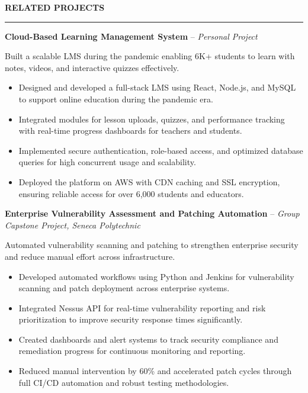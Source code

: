 \documentclass[10pt,letterpaper]{article}
\begin{document}
\vspace{6pt}

\textbf{RELATED PROJECTS}\\[-8pt]
\noindent\rule{\textwidth}{1pt}

\vspace{-2pt}

\textbf{Cloud-Based Learning Management System} -- \emph{Personal Project}

\vspace{-1pt}

Built a scalable LMS during the pandemic enabling 6K+ students to learn with notes, videos, and interactive quizzes effectively.
\vspace{-1pt}
\begin{itemize}
\item Designed and developed a full-stack LMS using React, Node.js, and MySQL to support online education during the pandemic era.
\item Integrated modules for lesson uploads, quizzes, and performance tracking with real-time progress dashboards for teachers and students.
\item Implemented secure authentication, role-based access, and optimized database queries for high concurrent usage and scalability.
\item Deployed the platform on AWS with CDN caching and SSL encryption, ensuring reliable access for over 6,000 students and educators.
\end{itemize}

\textbf{Enterprise Vulnerability Assessment and Patching Automation} -- \emph{Group Capstone Project, Seneca Polytechnic }

\vspace{-1pt}

Automated vulnerability scanning and patching to strengthen enterprise security and reduce manual effort across infrastructure.
\vspace{-1pt}
\begin{itemize}
\item Developed automated workflows using Python and Jenkins for vulnerability scanning and patch deployment across enterprise systems.
\item Integrated Nessus API for real-time vulnerability reporting and risk prioritization to improve security response times significantly.
\item Created dashboards and alert systems to track security compliance and remediation progress for continuous monitoring and reporting.
\item Reduced manual intervention by 60\% and accelerated patch cycles through full CI/CD automation and robust testing methodologies.
\end{itemize}
\end{document}
